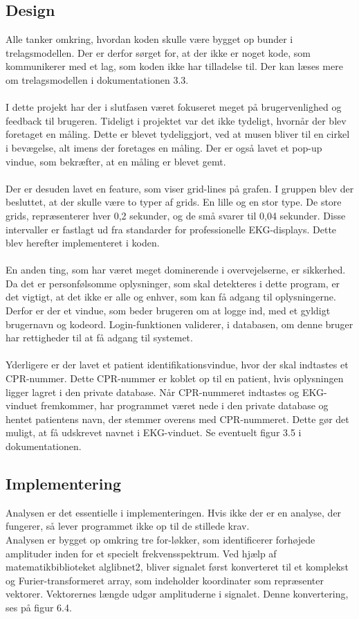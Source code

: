 \subsection{Design}
Alle tanker omkring, hvordan koden skulle være bygget op bunder i trelagsmodellen. Der er derfor sørget for, at der ikke er noget kode, som kommunikerer med et lag, som koden ikke har tilladelse til. Der kan læses mere om trelagsmodellen i dokumentationen 3.3.\\ \\
I dette projekt har der i slutfasen været fokuseret meget på brugervenlighed og feedback til brugeren. Tideligt i projektet var det ikke tydeligt, hvornår der blev foretaget en måling. Dette er blevet tydeliggjort, ved at musen bliver til en cirkel i bevægelse, alt imens der foretages en måling. Der er også lavet et pop-up vindue, som bekræfter, at en måling er blevet gemt.\\ \\
Der er desuden lavet en feature, som viser grid-lines på grafen. I gruppen blev der besluttet, at der skulle være to typer af grids. En lille og en stor type.  De store grids, repræsenterer hver 0,2 sekunder, og de små svarer til 0,04 sekunder. Disse intervaller er fastlagt ud fra standarder for professionelle EKG-displays.  Dette blev herefter implementeret i koden.\\ \\
En anden ting, som har været meget dominerende i overvejelserne, er sikkerhed. Da det er personfølsomme oplysninger, som skal detekteres i dette program, er det vigtigt, at det ikke er alle og enhver, som kan få adgang til oplysningerne. Derfor er der et vindue, som beder brugeren om at logge ind, med et gyldigt brugernavn og kodeord. Login-funktionen validerer, i databasen,  om denne bruger har rettigheder til at få adgang til systemet.\\ \\
Yderligere er der lavet et patient identifikationsvindue, hvor der skal indtastes et CPR-nummer. Dette CPR-nummer er koblet op til en patient, hvis oplysningen ligger lagret i den private database. Når CPR-nummeret indtastes og EKG-vinduet fremkommer, har programmet været nede i den private database og hentet patientens navn, der stemmer overens med CPR-nummeret. Dette gør det muligt, at få udskrevet navnet i EKG-vinduet. Se eventuelt figur 3.5 i dokumentationen.   

\subsection{Implementering}
Analysen er det essentielle i implementeringen. Hvis ikke der er en analyse, der fungerer, så lever programmet ikke op til de stillede krav.\\
Analysen er bygget op omkring tre for-løkker, som identificerer forhøjede amplituder inden for et specielt frekvensspektrum. Ved hjælp af matematikbiblioteket alglibnet2, bliver signalet først konverteret til et komplekst og Furier-transformeret array, som indeholder koordinater som repræsenter vektorer. Vektorernes længde udgør amplituderne i signalet. Denne konvertering, ses på figur 6.4. 


